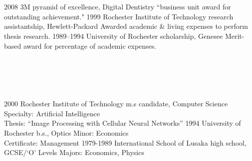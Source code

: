 \documentclass[]{friggeri-cv} %
\begin{document}
\section{{} {} {\normalsize {}}}

\begin{entrylist}
\entry
{2008}
{3M}
{pyramid of excellence, Digital Dentistry}
{``business unit award for outstanding achievement."}
\entry
{1999}
{Rochester Institute of Technology}
{research assistantship, Hewlett-Packard}
{Awarded academic \& living expenses to perform thesis research.}
\entry
{1989--1994}
{University of Rochester}
{scholarship, Genesee}
{Merit-based award for percentage of academic expenses.}
\end{entrylist}



\section{{} {} {\normalsize {} ~ }}

\begin{entrylist}
\entry
{2000}
{Rochester Institute of Technology}
{m.s candidate, Computer Science}
{Specialty: Artificial Intelligence\\
Thesis: ``Image Processing with Cellular Neural Networks''}
\entry
{1994}
{University of Rochester}
{b.s., Optics}
{Minor: Economics\\
Certificate: Management} 
\entry
{1979-1989}
{International School of Lusaka}
{high school, GCSE/`O' Levels}
{Majors: Economics, Physics}
\end{entrylist}
\end{document}
